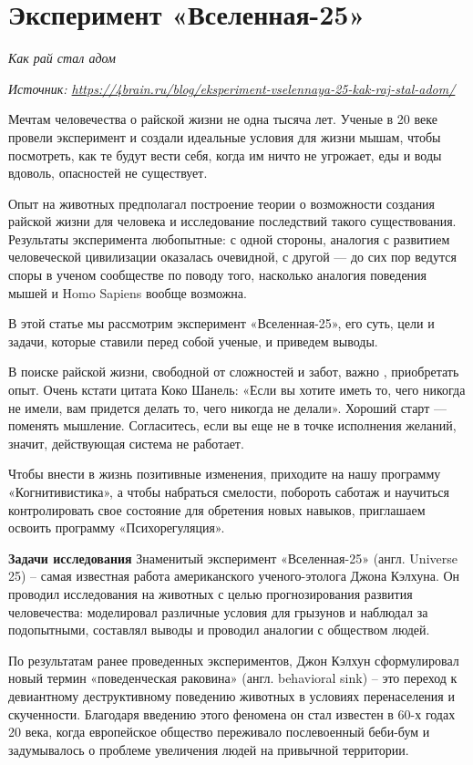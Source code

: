 \clearpage
\section{Эксперимент «Вселенная-25»}

\textit{Как рай стал адом}

\textit{Источник: \url{https://4brain.ru/blog/eksperiment-vselennaya-25-kak-raj-stal-adom/}}

Мечтам человечества о райской жизни не одна тысяча лет. Ученые в 20 веке провели эксперимент и создали идеальные условия для жизни мышам, чтобы посмотреть, как те будут вести себя, когда им ничто не угрожает, еды и воды вдоволь, опасностей не существует.

Опыт на животных предполагал построение теории о возможности создания райской жизни для человека и исследование последствий такого существования. Результаты эксперимента любопытные: с одной стороны, аналогия с развитием человеческой цивилизации оказалась очевидной, с другой --- до сих пор ведутся споры в ученом сообществе по поводу того, насколько аналогия поведения мышей и Homo Sapiens вообще возможна.

В этой статье мы рассмотрим эксперимент «Вселенная-25», его суть, цели и задачи, которые ставили перед собой ученые, и приведем выводы.

В поиске райской жизни, свободной от сложностей и забот, важно , приобретать опыт. Очень кстати цитата Коко Шанель: «Если вы хотите иметь то, чего никогда не имели, вам придется делать то, чего никогда не делали». Хороший старт --- поменять мышление. Согласитесь, если вы еще не в точке исполнения желаний, значит, действующая система не работает.

Чтобы внести в жизнь позитивные изменения, приходите на нашу программу «Когнитивистика», а чтобы набраться смелости, побороть саботаж и научиться контролировать свое состояние для обретения новых навыков, приглашаем освоить программу «Психорегуляция».

\textbf{Задачи исследования}
Знаменитый эксперимент «Вселенная-25» (англ. Universe 25) – самая известная работа американского ученого-этолога Джона  Кэлхуна. Он проводил исследования на животных с целью прогнозирования развития человечества: моделировал различные условия для грызунов и наблюдал за подопытными, составлял выводы и проводил аналогии с обществом людей.

По результатам ранее проведенных экспериментов, Джон  Кэлхун сформулировал новый термин «поведенческая раковина» (англ. behavioral sink) – это переход к девиантному деструктивному поведению животных в условиях перенаселения и скученности. Благодаря введению этого феномена он стал известен в 60-х годах 20 века, когда европейское общество переживало послевоенный беби-бум и задумывалось о проблеме увеличения  людей на привычной территории.

